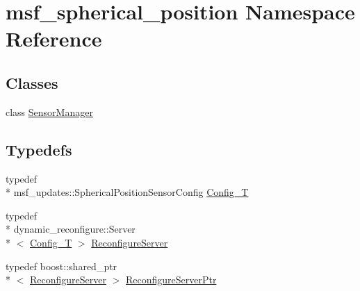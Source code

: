 \hypertarget{namespacemsf__spherical__position}{\section{msf\-\_\-spherical\-\_\-position Namespace Reference}
\label{namespacemsf__spherical__position}
}
\subsection*{Classes}
\begin{DoxyCompactItemize}
\item 
class \hyperlink{classmsf__spherical__position_1_1SensorManager}{Sensor\-Manager}
\end{DoxyCompactItemize}
\subsection*{Typedefs}
\begin{DoxyCompactItemize}
\item 
typedef \\*
msf\-\_\-updates\-::\-Spherical\-Position\-Sensor\-Config \hyperlink{namespacemsf__spherical__position_a48bbe0c42021c86a6ed32ae9c30df686}{Config\-\_\-\-T}
\item 
typedef \\*
dynamic\-\_\-reconfigure\-::\-Server\\*
$<$ \hyperlink{namespacemsf__spherical__position_a48bbe0c42021c86a6ed32ae9c30df686}{Config\-\_\-\-T} $>$ \hyperlink{namespacemsf__spherical__position_aac7e651c6eb11e553d7df1f1ac6eeebd}{Reconfigure\-Server}
\item 
typedef boost\-::shared\-\_\-ptr\\*
$<$ \hyperlink{namespacemsf__spherical__position_aac7e651c6eb11e553d7df1f1ac6eeebd}{Reconfigure\-Server} $>$ \hyperlink{namespacemsf__spherical__position_aecf7024b0d845666e7cf52970e31217f}{Reconfigure\-Server\-Ptr}
\end{DoxyCompactItemize}


